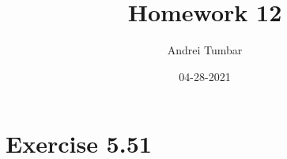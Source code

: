 \documentclass{article}
\title{\textbf{Homework 12}}
\author{Andrei Tumbar}
\date{04-28-2021}
\begin{document}
\maketitle
\thispagestyle{empty}


\newcommand*{\xMin}{0}%
\newcommand*{\xMax}{10}%
\newcommand*{\yMinA}{-15}%
\newcommand*{\yMinB}{-7}%
\newcommand*{\yMax}{0}%
\newcommand*{\topLabels}{
	A,$\widebar{A}$,
	B,$\widebar{B}$,
	C,$\widebar{C}$,
	D,$\widebar{D}$,
	\textbf{X},\textbf{Y},\textbf{Z}}

\section*{Exercise 5.51}
\end{document}
